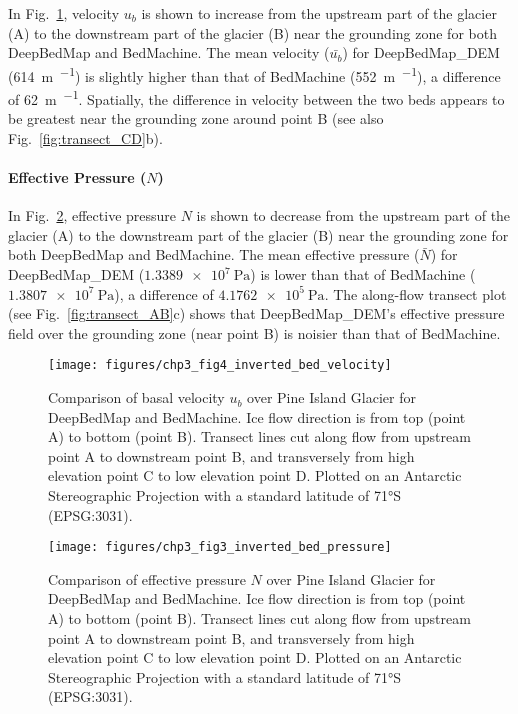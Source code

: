 In Fig.~\ref{fig:velocity}, velocity $u_b$ is shown to increase from the upstream part of the glacier (A) to the downstream part of the glacier (B) near the grounding zone for both DeepBedMap and BedMachine.
The mean velocity ($\bar{u_b}$) for DeepBedMap\_DEM (\SI{614}{\metre\per\year}) is slightly higher than that of BedMachine (\SI{552}{\metre\per\year}), a difference of \SI{62}{\metre\per\year}.
Spatially, the difference in velocity between the two beds appears to be greatest near the grounding zone around point B (see also Fig.~\ref{fig:transect_CD}b).

\paragraph{Effective Pressure ($N$)}

In Fig.~\ref{fig:effective_pressure}, effective pressure $N$ is shown to decrease from the upstream part of the glacier (A) to the downstream part of the glacier (B) near the grounding zone for both DeepBedMap and BedMachine.
The mean effective pressure ($\bar{N}$) for DeepBedMap\_DEM ($\SI{1.3389e7}{\pascal}$) is lower than that of BedMachine ($\SI{1.3807e7}{\pascal}$), a difference of $\SI{4.1762e5}{\pascal}$.
The along-flow transect plot (see Fig.~\ref{fig:transect_AB}c) shows that DeepBedMap\_DEM's effective pressure field over the grounding zone (near point B) is noisier than that of BedMachine.

\begin{landscape}
\begin{figure}[htbp]
  \texttt{[image: figures/chp3\_fig4\_inverted\_bed\_velocity]}
  \caption[Comparison of basal velocity over Pine Island Glacier for DeepBedMap and BedMachine]{
    Comparison of basal velocity $u_b$ over Pine Island Glacier for DeepBedMap and BedMachine.
    Ice flow direction is from top (point A) to bottom (point B).
    Transect lines cut along flow from upstream point A to downstream point B, and transversely from high elevation point C to low elevation point D.
    Plotted on an Antarctic Stereographic Projection with a standard latitude of 71°S (EPSG:3031).
  }
  \label{fig:velocity}
\end{figure}
\end{landscape}

\begin{landscape}
\begin{figure}[htbp]
  \texttt{[image: figures/chp3\_fig3\_inverted\_bed\_pressure]}
  \caption[Comparison of effective pressure over Pine Island Glacier for DeepBedMap and BedMachine]{
    Comparison of effective pressure $N$ over Pine Island Glacier for DeepBedMap and BedMachine.
    Ice flow direction is from top (point A) to bottom (point B).
    Transect lines cut along flow from upstream point A to downstream point B, and transversely from high elevation point C to low elevation point D.
    Plotted on an Antarctic Stereographic Projection with a standard latitude of 71°S (EPSG:3031).
  }
  \label{fig:effective_pressure}
\end{figure}
\end{landscape}

